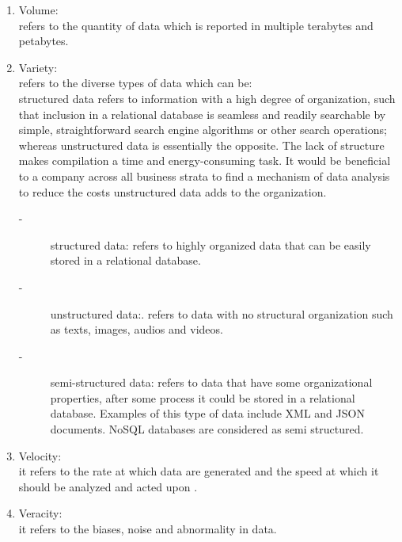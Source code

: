  	\begin{enumerate}
		\item Volume: \\ refers to the quantity of data which is reported in multiple terabytes and petabytes.  
	   	\item Variety: \\ refers to the diverse types of data which can be:\\
		structured data refers to information with a high degree of organization, such that inclusion in a relational database is seamless and readily searchable by simple, straightforward search engine algorithms or other search operations; whereas unstructured data is essentially the opposite. The lack of structure makes compilation a time and energy-consuming task. It would be beneficial to a company across all business strata to find a mechanism of data analysis to reduce the costs unstructured data adds to the organization. \cite{a:https://brightplanet.com/2012/06/structured-vs-unstructured-data/}
	   	\begin{description}
		\item[-] structured data: refers to highly organized data that can be easily stored in a relational database. \cite{a:https://brightplanet.com/2012/06/structured-vs-unstructured-data/} \\
		\item[-] unstructured data:.
refers to data with no structural organization such as texts, images, audios and videos. \cite{a:https://jeremyronk.wordpress.com/2014/09/01/structured-semi-structured-and-unstructured-data/}\\
		\item[-] semi-structured data: refers to data that have some organizational properties, after some process it could be stored in a relational database. Examples of this type of data include XML and JSON documents. NoSQL databases are considered as semi structured. \cite{a:https://brightplanet.com/2012/06/structured-vs-unstructured-data/} 
		\end{description}
			
		\item Velocity:\\ it refers to the rate at which data are generated and the
speed at which it should be analyzed and acted upon \cite{a:Beyond  the  hype}.
	    \item Veracity: \\ it refers to the biases, noise and abnormality in data. 	 
	\end{enumerate}	

